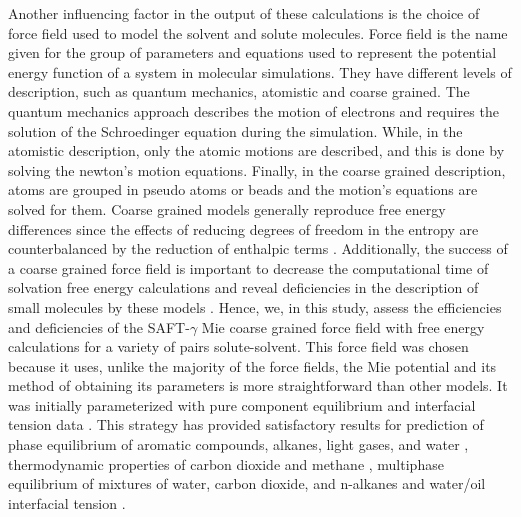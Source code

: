 {Another influencing factor in the output of these calculations is the choice of force field used to model the solvent and solute molecules. Force field is the name given for the group of parameters and equations used to represent the potential energy function of a system in molecular simulations. They have different levels of description, such as quantum mechanics, atomistic and coarse grained. The quantum mechanics approach describes the motion of electrons and requires the solution of the Schroedinger equation during the simulation. While, in the atomistic description, only the atomic motions are described,  and this is done by solving the newton's motion equations. Finally, in the coarse grained description, atoms are grouped in pseudo atoms or beads and the motion's equations are solved for them. Coarse grained models generally reproduce free energy differences since the effects of reducing degrees of freedom in the entropy are counterbalanced by the reduction of enthalpic terms \cite{kmiecik2016}. Additionally, the success of a coarse grained force field is important to decrease the computational time of solvation free energy calculations and reveal deficiencies in the description of small molecules by these models \cite{mobley2007,shirts2013}. Hence, we, in this study, assess the efficiencies and deficiencies of the SAFT-$\gamma$ Mie coarse grained force field  \cite{avendano2011} with free energy calculations for a variety of pairs solute-solvent. This force field was chosen because it uses, unlike the majority of the force fields, the Mie potential \cite{MIE} and its method of obtaining its parameters is more straightforward than other models. It was initially parameterized with pure component equilibrium and interfacial tension data \cite{avendano2011}. This strategy has provided satisfactory results for prediction of phase equilibrium of aromatic compounds, alkanes, light gases, and water \cite{herdes2015,muller2017,lobanova2015} , thermodynamic properties of carbon dioxide and methane \cite{cassiano1}, multiphase equilibrium of mixtures of water, carbon dioxide, and n-alkanes \cite{lobanova2016} and water/oil interfacial tension \cite{herdes2017}.} 


